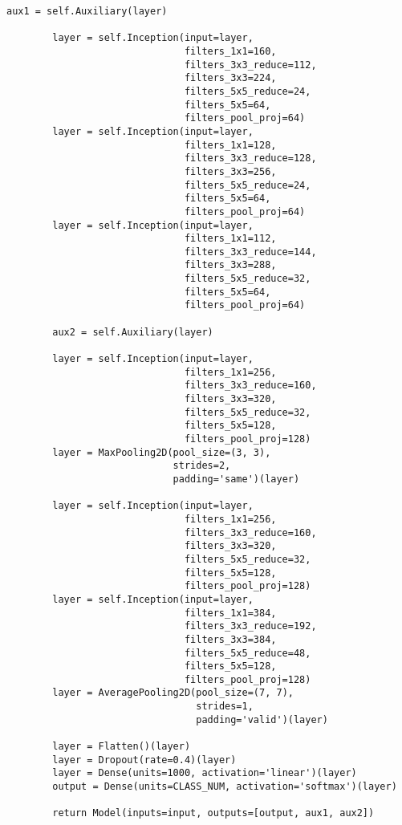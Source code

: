 \begin{lstlisting}[caption=Модель googlenet , label = lst:googlenet, style=realcode]
        aux1 = self.Auxiliary(layer)

        layer = self.Inception(input=layer,
                               filters_1x1=160,
                               filters_3x3_reduce=112,
                               filters_3x3=224,
                               filters_5x5_reduce=24,
                               filters_5x5=64,
                               filters_pool_proj=64)
        layer = self.Inception(input=layer,
                               filters_1x1=128,
                               filters_3x3_reduce=128,
                               filters_3x3=256,
                               filters_5x5_reduce=24,
                               filters_5x5=64,
                               filters_pool_proj=64)
        layer = self.Inception(input=layer,
                               filters_1x1=112,
                               filters_3x3_reduce=144,
                               filters_3x3=288,
                               filters_5x5_reduce=32,
                               filters_5x5=64,
                               filters_pool_proj=64)

        aux2 = self.Auxiliary(layer)

        layer = self.Inception(input=layer,
                               filters_1x1=256,
                               filters_3x3_reduce=160,
                               filters_3x3=320,
                               filters_5x5_reduce=32,
                               filters_5x5=128,
                               filters_pool_proj=128)
        layer = MaxPooling2D(pool_size=(3, 3),
                             strides=2,
                             padding='same')(layer)

        layer = self.Inception(input=layer,
                               filters_1x1=256,
                               filters_3x3_reduce=160,
                               filters_3x3=320,
                               filters_5x5_reduce=32,
                               filters_5x5=128,
                               filters_pool_proj=128)
        layer = self.Inception(input=layer,
                               filters_1x1=384,
                               filters_3x3_reduce=192,
                               filters_3x3=384,
                               filters_5x5_reduce=48,
                               filters_5x5=128,
                               filters_pool_proj=128)
        layer = AveragePooling2D(pool_size=(7, 7),
                                 strides=1,
                                 padding='valid')(layer)

        layer = Flatten()(layer)
        layer = Dropout(rate=0.4)(layer)
        layer = Dense(units=1000, activation='linear')(layer)
        output = Dense(units=CLASS_NUM, activation='softmax')(layer)

        return Model(inputs=input, outputs=[output, aux1, aux2])
\end{lstlisting}

